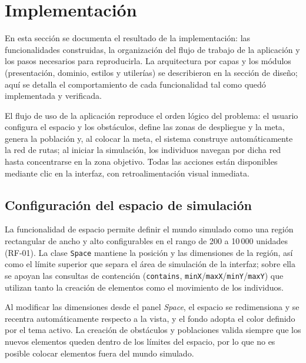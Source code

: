 \documentclass[12pt,a4paper]{article}
\begin{document}

\section{Implementación}

En esta sección se documenta el resultado de la implementación: las funcionalidades construidas, la organización del flujo de trabajo de la aplicación y los pasos necesarios para reproducirla. La arquitectura por capas y los módulos (presentación, dominio, estilos y utilerías) se describieron en la sección de diseño; aquí se detalla el comportamiento de cada funcionalidad tal como quedó implementada y verificada.

El flujo de uso de la aplicación reproduce el orden lógico del problema: el usuario configura el espacio y los obstáculos, define las zonas de despliegue y la meta, genera la población y, al colocar la meta, el sistema construye automáticamente la red de rutas; al iniciar la simulación, los individuos navegan por dicha red hasta concentrarse en la zona objetivo. Todas las acciones están disponibles mediante clic en la interfaz, con retroalimentación visual inmediata.

\subsection{Configuración del espacio de simulación}

La funcionalidad de espacio permite definir el mundo simulado como una región rectangular de ancho y alto configurables en el rango de 200 a 10\,000 unidades (RF-01). La clase \texttt{Space} mantiene la posición y las dimensiones de la región, así como el límite superior que separa el área de simulación de la interfaz; sobre ella se apoyan las consultas de contención (\texttt{contains}, \texttt{minX}/\texttt{maxX}/\texttt{minY}/\texttt{maxY}) que utilizan tanto la creación de elementos como el movimiento de los individuos.

Al modificar las dimensiones desde el panel \emph{Space}, el espacio se redimensiona y se recentra automáticamente respecto a la vista, y el fondo adopta el color definido por el tema activo. La creación de obstáculos y poblaciones valida siempre que los nuevos elementos queden dentro de los límites del espacio, por lo que no es posible colocar elementos fuera del mundo simulado.
\end{document}
